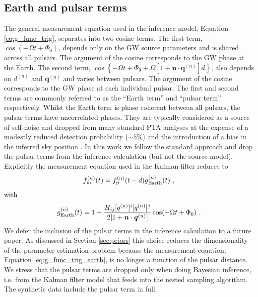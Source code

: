 \documentclass[fleqn,usenatbib,useAMS]{mnras}
\begin{document}
\begin{table}
{}
	\label{tab:parameters_and_priors}
\end{table}




\subsection{Earth and pulsar terms}\label{sec:earth_psr_terms}
The general measurement equation used in the inference model, Equation \eqref{eq:g_func_trig}, separates into two cosine terms. The first term, $\cos(-\Omega t + \Phi_0)$, depends only on the GW source parameters and is shared across all pulsars. The argument of the cosine corresponds to the GW phase at the Earth.  The second term, $\cos \left \{-\Omega t +\Phi_0 + \Omega \left[1 + \boldsymbol{n}\cdot \boldsymbol{q}^{(n)} \right]  d \right \}$, also depends on $d^{(n)}$ and $\boldsymbol{q}^{(n)}$ and varies between pulsars. The argument of the cosine corresponds to the GW phase at each individual pulsar. The first and second terms are commonly referred to as the ``Earth term'' and ``pulsar term'' respectively. Whilst the Earth term is phase coherent between all pulsars, the pulsar terms have uncorrelated phases. They are typically considered as a source of self-noise and dropped from many standard PTA analyses \citep[e.g.][]{Sesana2010,Babak2012,Petiteau2013,Zhu2015,Taylors2016,Goldstein2018,Charisi2023arXiv230403786C} at the expense of a modestly reduced detection probability ($\sim 5 \%$) and the introduction of a bias in the inferred sky position \citep{Zhupulsarterms,Chen2022}. In this work we follow the standard approach and drop the pulsar terms from the inference calculation (but not the source model). Explicitly the measurement equation used in the Kalman filter reduces to
\begin{equation}
		f_{\rm m}^{(n)}(t) = f_{\rm p}^{(n)}(t-d) g^{(n)}_{\rm Earth}(t) \ , 
		\label{eq:measuremen_earth}
	\end{equation}
	with
	\begin{equation}
		g^{(n)}_{\rm Earth}(t) = 1 - \frac{ H_{ij}[q^{(n)}]^i [q^{(n)}]^j}{2[1 + \boldsymbol{n}\cdot \boldsymbol{q}^{(n)}] }  \cos(-\Omega t +\Phi_0)  \ .
		\label{eq:g_func_trig_earth}
	\end{equation}
	We defer the inclusion of the pulsar terms in the inference calculation to a future paper. As discussed in Section \ref{sec:priors} this choice reduces the dimensionality of the parameter estimation problem because the measurement equation, Equation \eqref{eq:g_func_trig_earth}, is no longer a function of the pulsar distance.  We stress that the pulsar terms are dropped only when doing Bayesian inference, i.e. from the Kalman filter model that feeds into the nested sampling algorithm. The synthetic data include the pulsar term in full. \newline 
	
\end{document}
